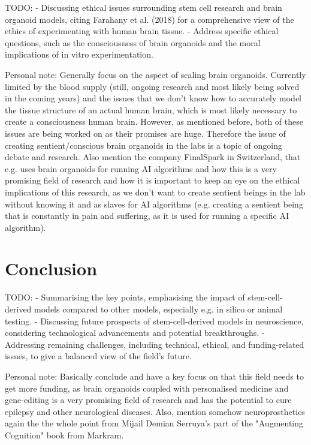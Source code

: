 \documentclass[10pt]{article}
\begin{document}
\begin{sloppypar}
  TODO:
  - Discussing ethical issues surrounding stem cell research and brain organoid models, citing Farahany et al. (2018) for a comprehensive view of the ethics of experimenting with human brain tissue.
  - Address specific ethical questions, such as the consciousness of brain organoids and the moral implications of in vitro experimentation.

  Personal note: Generally focus on the aspect of scaling brain organoids. Currently limited by the blood supply (still, ongoing research and most likely being solved in the coming years) and the issues that we don't know how to accurately model the tissue structure of an actual human brain, which is most likely necessary to create a consciousness human brain. However, as mentioned before, both of these issues are being worked on as their promises are huge. Therefore the issue of creating sentient/conscious brain organoids in the labs is a topic of ongoing debate and research. Also mention the company FinalSpark in Switzerland, that e.g. uses brain organoids for running AI algorithms and how this is a very promising field of research and how it is important to keep an eye on the ethical implications of this research, as we don't want to create sentient beings in the lab without knowing it and as slaves for AI algorithms (e.g. creating a sentient being that is constantly in pain and suffering, as it is used for running a specific AI algorithm).

  \section{Conclusion}
  \label{sec:conclusion}

  TODO:
  - Summarising the key points, emphasising the impact of stem-cell-derived models compared to other models, especially e.g. in silico or animal testing.
  - Discussing future prospects of stem-cell-derived models in neuroscience, considering technological advancements and potential breakthroughs.
  - Addressing remaining challenges, including technical, ethical, and funding-related issues, to give a balanced view of the field's future.

  Personal note: Basically conclude and have a key focus on that this field needs to get more funding, as brain organoids coupled with personalised medicine and gene-editing is a very promising field of research and has the potential to cure epilepsy and other neurological diseases. Also, mention somehow neuroprosthetics again the the whole point from Mijail Demian Serruya's part of the "Augmenting Cognition" book from Markram.


  \pagebreak
  
  

\end{sloppypar}
\end{document}
